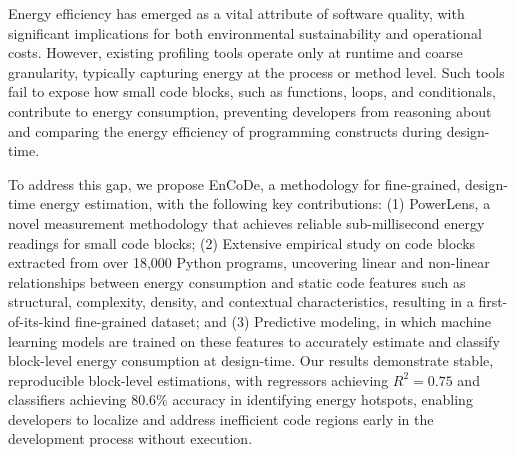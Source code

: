 Energy efficiency has emerged as a vital attribute of software quality, with significant implications for both environmental sustainability and operational costs. However, existing profiling tools operate only at runtime and coarse granularity, typically capturing energy at the process or method level. Such tools fail to expose how small code blocks, such as functions, loops, and conditionals, contribute to energy consumption, preventing developers from reasoning about and comparing the energy efficiency of programming constructs during design-time. 

To address this gap, we propose EnCoDe, a methodology for fine-grained, design-time energy estimation, with the following key contributions: (1) PowerLens, a novel measurement methodology that achieves reliable sub-millisecond energy readings for small code blocks; (2) Extensive empirical study on code blocks extracted from over 18,000 Python programs, uncovering linear and non-linear relationships between energy consumption and static code features such as structural, complexity, density, and contextual characteristics, resulting in a first-of-its-kind fine-grained dataset; and (3) Predictive modeling, in which machine learning models are trained on these features to accurately estimate and classify block-level energy consumption at design-time. Our results demonstrate stable, reproducible block-level estimations, with regressors achieving $R^2 = 0.75$ and classifiers achieving $80.6\%$ accuracy in identifying energy hotspots, enabling developers to localize and address inefficient code regions early in the development process without execution.






